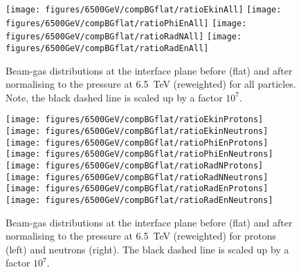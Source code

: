 \begin{figure}
\begin{center}
  \texttt{[image: figures/6500GeV/compBGflat/ratioEkinAll]}
  \texttt{[image: figures/6500GeV/compBGflat/ratioPhiEnAll]}
  \texttt{[image: figures/6500GeV/compBGflat/ratioRadNAll]}
  \texttt{[image: figures/6500GeV/compBGflat/ratioRadEnAll]}
\end{center}
\vspace{-0.6cm}
 \caption{Beam-gas distributions at the interface plane before (flat) and after normalising to the pressure at 6.5~TeV (reweighted) for all particles. Note, the black dashed line is scaled up by a factor $10^7$.
  \label{fig:EkinPhiEn6p52}}
\end{figure}



\begin{figure}
\begin{center}
  \texttt{[image: figures/6500GeV/compBGflat/ratioEkinProtons]}
  \texttt{[image: figures/6500GeV/compBGflat/ratioEkinNeutrons]}
  \texttt{[image: figures/6500GeV/compBGflat/ratioPhiEnProtons]}
  \texttt{[image: figures/6500GeV/compBGflat/ratioPhiEnNeutrons]}
  \texttt{[image: figures/6500GeV/compBGflat/ratioRadNProtons]}
  \texttt{[image: figures/6500GeV/compBGflat/ratioRadNNeutrons]}
  \texttt{[image: figures/6500GeV/compBGflat/ratioRadEnProtons]}
  \texttt{[image: figures/6500GeV/compBGflat/ratioRadEnNeutrons]}
\end{center}
\vspace{-0.6cm}
 \caption{Beam-gas distributions at the interface plane before (flat) and after normalising to the pressure at 6.5~TeV (reweighted) for protons (left) and neutrons (right). The black dashed line is scaled up by a factor $10^7$.
  \label{fig:ProtNeut6p52}} 
\end{figure}

\clearpage

